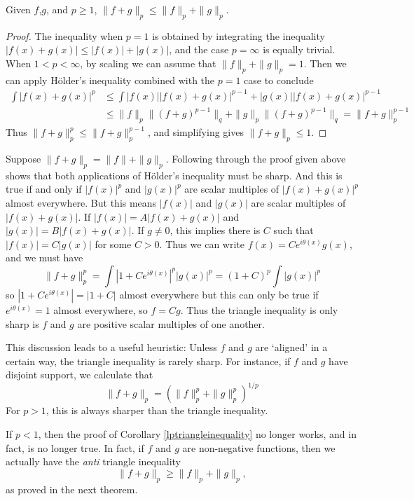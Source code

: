 \begin{corollary} \label{lptriangleinequality}
  Given $f$,$g$, and $p \geq 1$, $\| f + g \|_p \leq \| f \|_p + \| g \|_p$.
\end{corollary}
\begin{proof}
  The inequality when $p = 1$ is obtained by integrating the inequality $|f(x) + g(x)| \leq |f(x)| + |g(x)|$, and the case $p = \infty$ is equally trivial. When $1 < p < \infty$, by scaling we can assume that $\| f \|_p + \| g \|_p = 1$. Then we can apply H\"{o}lder's inequality combined with the $p = 1$ case to conclude
  \begin{align*}
    \int |f(x) + g(x)|^p &\leq \int |f(x)| |f(x) + g(x)|^{p-1} + |g(x)| |f(x) + g(x)|^{p-1}\\
    &\leq \| f \|_p \| (f + g)^{p-1} \|_q + \| g \|_p \| (f + g)^{p-1} \|_q = \| f + g \|_{p}^{p-1}
  \end{align*}
  Thus $\| f + g \|_p^p \leq \| f + g \|_p^{p-1}$, and simplifying gives $\| f + g \|_p \leq 1$.
\end{proof}

\begin{remark}
  Suppose $\| f + g \|_p = \| f \| + \| g \|_p$. Following through the proof given above shows that both applications of H\"{o}lder's inequality must be sharp. And this is true if and only if $|f(x)|^p$ and $|g(x)|^p$ are scalar multiples of $|f(x) + g(x)|^p$ almost everywhere. But this means $|f(x)|$ and $|g(x)|$ are scalar multiples of $|f(x) + g(x)|$. If $|f(x)| = A|f(x) + g(x)|$ and $|g(x)| = B|f(x) + g(x)|$. If $g \neq 0$, this implies there is $C$ such that $|f(x)| = C |g(x)|$ for some $C > 0$. Thus we can write $f(x) = C e^{i \theta(x)} g(x)$, and we must have
  \[ \| f + g \|_p^p = \int |1 + C e^{i \theta(x)}|^p |g(x)|^p = (1 + C)^p \int |g(x)|^p \]
  so $|1 + Ce^{i \theta(x)}| = |1 + C|$ almost everywhere but this can only be true if $e^{i \theta(x)} = 1$ almost everywhere, so $f = C g$. Thus the triangle inequality is only sharp is $f$ and $g$ are positive scalar multiples of one another.
\end{remark}

This discussion leads to a useful heuristic: Unless $f$ and $g$ are `aligned' in a certain way, the triangle inequality is rarely sharp. For instance, if $f$ and $g$ have disjoint support, we calculate that
%
\[ \| f + g \|_p = \left( \| f \|_p^p + \| g \|_p^p \right)^{1/p} \]
%
For $p > 1$, this is always sharper than the triangle inequality.

If $p < 1$, then the proof of Corollary \ref{lptriangleinequality} no longer works, and in fact, is no longer true. In fact, if $f$ and $g$ are non-negative functions, then we actually have the \emph{anti} triangle inequality
%
\[ \| f + g \|_p \geq \| f \|_p + \| g \|_p, \]
%
as proved in the next theorem.


